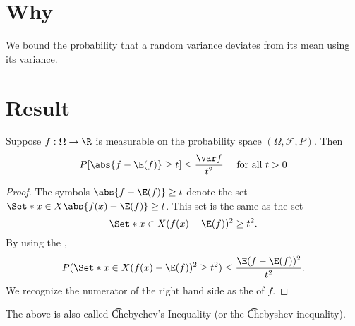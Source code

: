 
\section*{Why}

We bound the probability that a random variance deviates from its mean using its variance.

\section*{Result}


\begin{proposition}
Suppose $f: \Omega  \to \R $ is measurable on the probability space $(\Omega , \mathcal{F} , P)$.
Then
\[
P[\abs{f - \E (f)} \geq t] \leq \frac{\var f}{t^2} \quad \text{ for all } t > 0
\]
\begin{proof}The symbols $\abs{f - \E (f)} \geq t$ denote the set $\Set*{x \in X}{ \abs{f(x) - \E (f)} \geq t}$.
This set is the same as the set
\[
\Set*{x \in X}{({f(x) - \E (f)})^2 \geq t^2}.
\]
By using the ,
\[
P(\Set*{x \in X}{({f(x) - \E (f)})^2 \geq t^2})
\leq
\frac{\E (f - \E (f))^2}{t^2}.
\]
We recognize the numerator of the right hand side as the of $f$.\end{proof}
\end{proposition}

The above is also called \t{Chebychev's Inequality} (or the \t{Chebyshev inequality}).

\blankpage